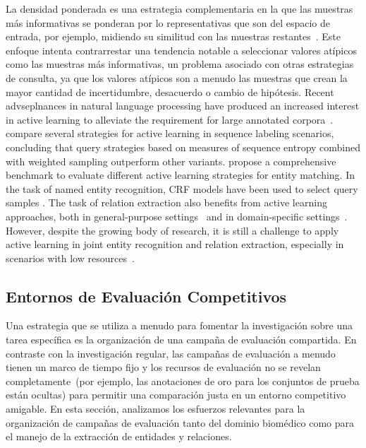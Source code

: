 La densidad ponderada es una estrategia complementaria en la que las muestras más informativas se ponderan por lo representativas que son del espacio de entrada, por ejemplo, midiendo su similitud con las muestras restantes~\cite{settles2008analysis}.
Este enfoque intenta contrarrestar una tendencia notable a seleccionar valores atípicos como las muestras más informativas, un problema asociado con otras estrategias de consulta, ya que los valores atípicos son a menudo las muestras que crean la mayor cantidad de incertidumbre, desacuerdo o cambio de hipótesis.
Recent advseplnances in natural language processing have produced an increased interest in active learning to alleviate the requirement for large annotated corpora~\cite{Olsson2009ALS, Tchoua2019ActiveLY}.
\citet{settles2008analysis} compare several strategies for active learning in sequence labeling scenarios, concluding that query strategies based on measures of sequence entropy combined with weighted sampling outperform other variants.
\citet{Meduri2020ACB} propose a comprehensive benchmark to evaluate different active learning strategies for entity matching.
In the task of named entity recognition, CRF models have been used to select query samples
\citep{Claveau2017StrategiesTS, Lin2019AlpacaTagAA}.
The task of relation extraction also benefits from active learning approaches, both in general-purpose settings~\cite{fu2013efficient} and in domain-specific settings~\cite{zhang2012unified}.
However, despite the growing body of research, it is still a challenge to apply active learning in joint entity recognition and relation extraction, especially in scenarios with low resources~\cite{Gao2019ActiveER}.

\subsection{Entornos de Evaluación Competitivos}

Una estrategia que se utiliza a menudo para fomentar la investigación sobre una tarea específica es la organización de una campaña de evaluación compartida. En contraste con la investigación regular, las campañas de evaluación a menudo tienen un marco de tiempo fijo y los recursos de evaluación no se revelan completamente~(por ejemplo, las anotaciones de oro para los conjuntos de prueba están ocultas) para permitir una comparación justa en un entorno competitivo amigable. En esta sección, analizamos los esfuerzos relevantes para la organización de campañas de evaluación tanto del dominio biomédico como para el manejo de la extracción de entidades y relaciones.

